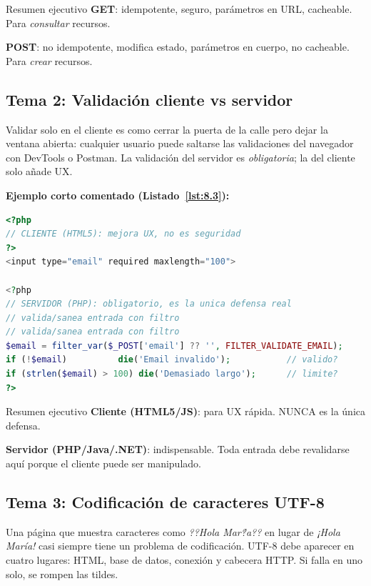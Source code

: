 \documentclass[11pt,a4paper,openany]{book}
\begin{document}
\begin{cajadefinicion}{Resumen ejecutivo}
\textbf{GET}: idempotente, seguro, parámetros en URL,
cacheable. Para \emph{consultar} recursos.

\textbf{POST}: no idempotente, modifica estado, parámetros en cuerpo,
no cacheable. Para \emph{crear} recursos.
\end{cajadefinicion}

\subsection{Tema 2: Validación cliente vs servidor}

Validar solo en el cliente es como cerrar la puerta de la
calle pero dejar la ventana abierta: cualquier usuario puede saltarse
las validaciones del navegador con DevTools o Postman. La validación
del servidor es \emph{obligatoria}; la del cliente solo añade UX.

\textbf{Ejemplo corto comentado (Listado~\ref{lst:8.3}):}
\begin{lstlisting}[language=PHP,numbers=none,caption={Ejemplo de PHP},label=lst:8.3]
<?php
// CLIENTE (HTML5): mejora UX, no es seguridad
?>
<input type="email" required maxlength="100">

<?php
// SERVIDOR (PHP): obligatorio, es la unica defensa real
// valida/sanea entrada con filtro
// valida/sanea entrada con filtro
$email = filter_var($_POST['email'] ?? '', FILTER_VALIDATE_EMAIL);
if (!$email)          die('Email invalido');           // valido?
if (strlen($email) > 100) die('Demasiado largo');      // limite?
?>
\end{lstlisting}


\begin{cajadefinicion}{Resumen ejecutivo}
\textbf{Cliente (HTML5/JS)}: para UX rápida. NUNCA es la única
defensa.

\textbf{Servidor (PHP/Java/.NET)}: indispensable. Toda entrada debe
revalidarse aquí porque el cliente puede ser manipulado.
\end{cajadefinicion}

\subsection{Tema 3: Codificación de caracteres UTF-8}

Una página que muestra caracteres como \emph{??Hola Mar\'?a??}
en lugar de \emph{¡Hola María!} casi siempre tiene un problema de
codificación. UTF-8 debe aparecer en cuatro lugares: HTML, base de
datos, conexión y cabecera HTTP. Si falla en uno solo, se rompen
las tildes.
\end{document}
